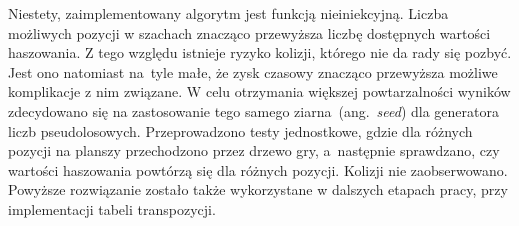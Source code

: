 Niestety, zaimplementowany algorytm jest funkcją nieiniekcyjną.
Liczba możliwych pozycji w szachach znacząco przewyższa liczbę dostępnych wartości haszowania.
Z tego względu istnieje ryzyko kolizji, którego nie da rady się pozbyć.
Jest ono natomiast na~tyle małe, że zysk czasowy znacząco przewyższa możliwe komplikacje z nim związane.
W celu otrzymania większej powtarzalności wyników zdecydowano się na zastosowanie tego samego ziarna~(ang.~\emph{seed}) dla generatora liczb pseudolosowych.
Przeprowadzono testy jednostkowe, gdzie dla różnych pozycji na planszy przechodzono przez drzewo gry, a~następnie sprawdzano, czy wartości haszowania powtórzą się dla różnych pozycji.
Kolizji nie zaobserwowano.
Powyższe rozwiązanie zostało także wykorzystane w dalszych etapach pracy, przy implementacji tabeli transpozycji.



